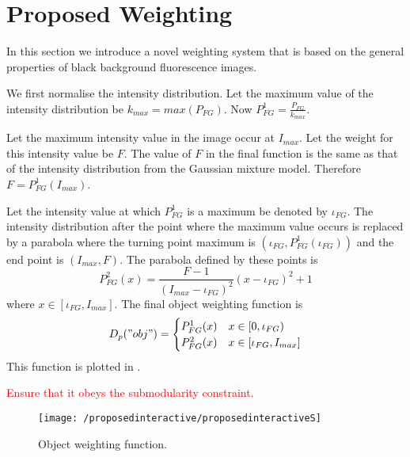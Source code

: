 \section{Proposed Weighting}
\label{sec:interactiveproposedweighting}

In this section we introduce a novel weighting system that is based on the general properties of black background fluorescence images.

\begin{definition}
	We first normalise the intensity distribution. Let the maximum value of the intensity distribution be $k_{max}= max(P_{FG})$. Now $P_{FG}^{1} = \frac{P_{FG}}{k_{max}}$.
	
	Let the maximum intensity value in the image occur at $I_{max}$. Let the weight for this intensity value be $F$. The value of $F$ in the final function is the same as that of the intensity distribution from the Gaussian mixture model. Therefore $F = P_{FG}^{1}(I_{max})$.
	
	Let the intensity value at which $P_{FG}^{1}$ is a maximum be denoted by $\iota_{FG}$. The intensity distribution after the point where the maximum value occurs is replaced by a parabola where the turning point maximum is $\left(\iota_{FG}, P_{FG}^{1}(\iota_{FG})\right)$ and the end point is $(I_{max},F)$. The parabola defined by these points is 
	\begin{equation}
		P_{FG}^2(x) = \frac{F-1}{(I_{max}-\iota_{FG})^2}(x-\iota_{FG})^2 +1 
	\end{equation}
	where $x \in [\iota_{FG},I_{max}]$.
	The final object weighting function  is
	\begin{equation}
		D_p("obj") = \begin{cases} 
		P_{FG}^1(x) & x \in [0,\iota_{FG}) \\
		P_{FG}^2(x) & x \in [\iota_{FG},I_{max}]
		\end{cases}
	\end{equation}
	This function is plotted in . 
	
	\textcolor{red}{Ensure that it obeys the submodularity constraint.}
		
	\begin{figure}[!h]
		\centering
		\texttt{[image: /proposedinteractive/proposedinteractiveS]}
		\caption{Object weighting function.}
		\label{fig:proposedinteractiveS}
	\end{figure}
\end{definition}


